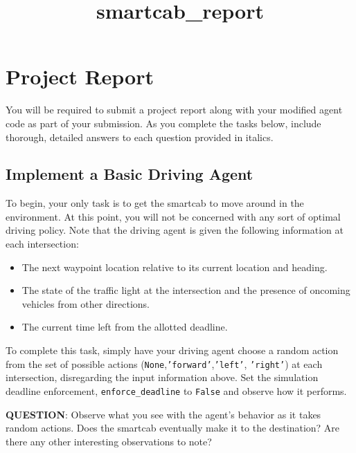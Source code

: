 \documentclass[11pt]{article}
\title{smartcab\_report}
\begin{document}
    
    
    \maketitle
    
    

    
    \section{Project Report}\label{project-report}

You will be required to submit a project report along with your modified
agent code as part of your submission. As you complete the tasks below,
include thorough, detailed answers to each question provided in italics.

\subsection{Implement a Basic Driving
Agent}\label{implement-a-basic-driving-agent}

To begin, your only task is to get the smartcab to move around in the
environment. At this point, you will not be concerned with any sort of
optimal driving policy. Note that the driving agent is given the
following information at each intersection:

\begin{itemize}
\itemsep1pt\parskip0pt
\item
  The next waypoint location relative to its current location and
  heading.
\item
  The state of the traffic light at the intersection and the presence of
  oncoming vehicles from other directions.
\item
  The current time left from the allotted deadline.
\end{itemize}

To complete this task, simply have your driving agent choose a random
action from the set of possible actions
(\texttt{None},\texttt{'forward'},\texttt{'left'}, \texttt{'right'}) at
each intersection, disregarding the input information above. Set the
simulation deadline enforcement, \texttt{enforce\_deadline} to
\texttt{False} and observe how it performs.

\textbf{QUESTION}: Observe what you see with the agent's behavior as it
takes random actions. Does the smartcab eventually make it to the
destination? Are there any other interesting observations to note?
\end{document}
